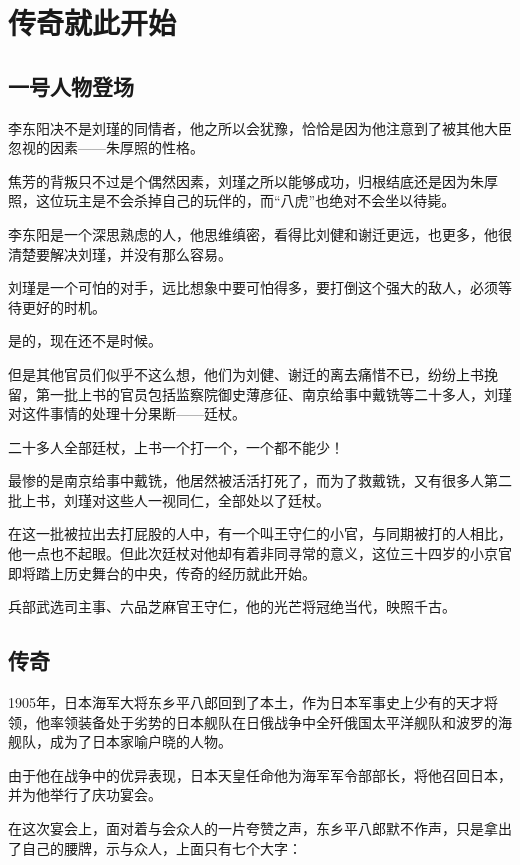 \section{传奇就此开始}
\ifnum{}
	\begin{multicols}{\theparacolNo}
		\fi
		\subsection{一号人物登场}
		李东阳决不是刘瑾的同情者，他之所以会犹豫，恰恰是因为他注意到了被其他大臣忽视的因素——朱厚照的性格。

		焦芳的背叛只不过是个偶然因素，刘瑾之所以能够成功，归根结底还是因为朱厚照，这位玩主是不会杀掉自己的玩伴的，而“八虎”也绝对不会坐以待毙。

		李东阳是一个深思熟虑的人，他思维缜密，看得比刘健和谢迁更远，也更多，他很清楚要解决刘瑾，并没有那么容易。

		刘瑾是一个可怕的对手，远比想象中要可怕得多，要打倒这个强大的敌人，必须等待更好的时机。

		是的，现在还不是时候。

		但是其他官员们似乎不这么想，他们为刘健、谢迁的离去痛惜不已，纷纷上书挽留，第一批上书的官员包括监察院御史薄彦征、南京给事中戴铣等二十多人，刘瑾对这件事情的处理十分果断——廷杖。

		二十多人全部廷杖，上书一个打一个，一个都不能少！

		最惨的是南京给事中戴铣，他居然被活活打死了，而为了救戴铣，又有很多人第二批上书，刘瑾对这些人一视同仁，全部处以了廷杖。

		在这一批被拉出去打屁股的人中，有一个叫王守仁的小官，与同期被打的人相比，他一点也不起眼。但此次廷杖对他却有着非同寻常的意义，这位三十四岁的小京官即将踏上历史舞台的中央，传奇的经历就此开始。

		兵部武选司主事、六品芝麻官王守仁，他的光芒将冠绝当代，映照千古。

		\subsection{传奇}
		1905年，日本海军大将东乡平八郎回到了本土，作为日本军事史上少有的天才将领，他率领装备处于劣势的日本舰队在日俄战争中全歼俄国太平洋舰队和波罗的海舰队，成为了日本家喻户晓的人物。

		由于他在战争中的优异表现，日本天皇任命他为海军军令部部长，将他召回日本，并为他举行了庆功宴会。

		在这次宴会上，面对着与会众人的一片夸赞之声，东乡平八郎默不作声，只是拿出了自己的腰牌，示与众人，上面只有七个大字：


\end{multicols}
